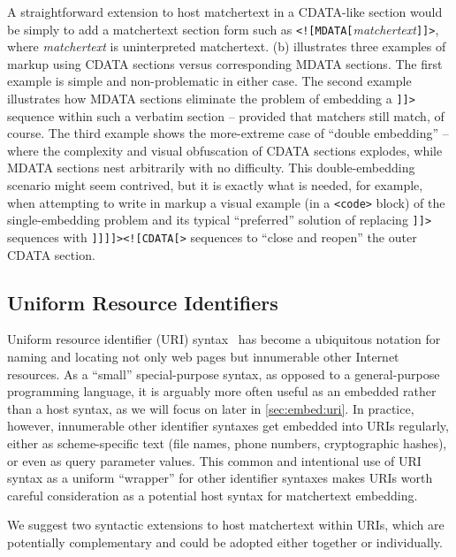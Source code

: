 A straightforward extension to host matchertext in a CDATA-like section
would be simply to add a matchertext section form
such as \verb|<![MDATA[|\emph{matchertext}\verb|]]>|,
where \emph{matchertext} is uninterpreted matchertext.
(b) illustrates three examples of markup
using CDATA sections versus corresponding MDATA sections.
The first example is simple and non-problematic in either case.
The second example illustrates how MDATA sections eliminate the problem
of embedding a \verb|]]>| sequence within such a verbatim section --
provided that matchers still match, of course.
The third example shows the more-extreme case of ``double embedding'' --
where the complexity and visual obfuscation of CDATA sections explodes,
while MDATA sections nest arbitrarily with no difficulty.
This double-embedding scenario might seem contrived,
but it is exactly what is needed, for example,
when attempting to write in \ml markup a visual example
(\eg in a \verb|<code>| block)
of the single-embedding problem and its typical ``preferred'' solution
of replacing \verb|]]>| sequences with \verb|]]]]><![CDATA[>| sequences
to ``close and reopen'' the outer CDATA section.


\subsection{Uniform Resource Identifiers}
\label{sec:host:uri}

Uniform resource identifier (URI) syntax~\cite{rfc3986}
has become a ubiquitous notation for naming and locating
not only web pages but innumerable other Internet resources.
As a ``small'' special-purpose syntax,
as opposed to a general-purpose programming language,
it is arguably more often useful as an embedded rather than a host syntax,
as we will focus on later in \cref{sec:embed:uri}.
In practice, however, innumerable other identifier syntaxes
get embedded into URIs regularly,
either as scheme-specific text
(\eg file names, phone numbers, cryptographic hashes),
or even as query parameter values.
This common and intentional use of URI syntax
as a uniform ``wrapper'' for other identifier syntaxes
makes URIs worth careful consideration as a potential host syntax
for matchertext embedding.

We suggest two syntactic extensions
to host matchertext within URIs,
which are potentially complementary
and could be adopted either together or individually.


